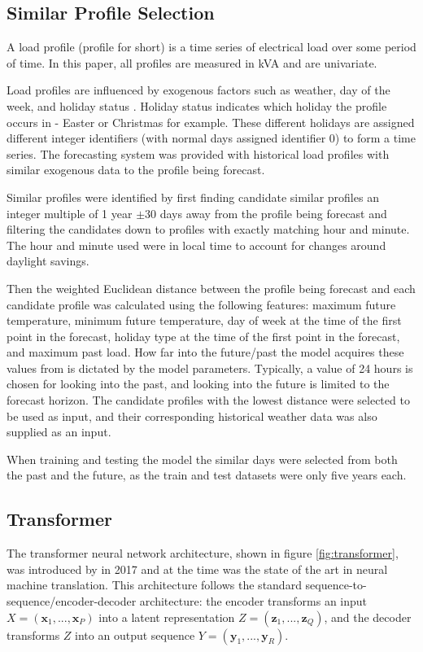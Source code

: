 \documentclass[conference]{IEEEtran}
\begin{document}
\subsection{Similar Profile Selection}
A load profile (profile for short) is a time series of electrical load over some period of time.
In this paper, all profiles are measured in kVA and are univariate. 

Load profiles are influenced by exogenous factors such as weather, day of the week, and holiday status \cite{Weron2006}.
Holiday status indicates which holiday the profile occurs in - Easter or Christmas for example.
These different holidays are assigned different integer identifiers (with normal days assigned identifier 0) to form a time series.
The forecasting system was provided with historical load profiles with similar exogenous data to the profile being forecast.
\par
Similar profiles were identified by first finding candidate similar profiles an integer multiple of 1 year $\pm$30 days away from the profile being forecast and filtering the candidates down to profiles with exactly matching hour and minute.
The hour and minute used were in local time to account for changes around daylight savings.

Then the weighted Euclidean distance between the profile being forecast and each candidate profile was calculated using the following features: maximum future temperature, minimum future temperature, day of week at the time of the first point in the forecast, holiday type at the time of the first point in the forecast, and maximum past load.
How far into the future/past the model acquires these values from is dictated by the model parameters.
Typically, a value of 24 hours is chosen for looking into the past, and looking into the future is limited to the forecast horizon.
The candidate profiles with the lowest distance were selected to be used as input, and their corresponding historical weather data was also supplied as an input.
\par
When training and testing the model the similar days were selected from both the past and the future, as the train and test datasets were only five years each.
\subsection{Transformer}
The transformer neural network architecture, shown in figure \ref{fig:transformer}, was introduced by \cite{Vaswani2017} in 2017 and at the time was the state of the art in neural machine translation.
This architecture follows the standard sequence-to-sequence/encoder-decoder architecture: the encoder transforms an input $X = (\boldsymbol{x}_1, ..., \boldsymbol{x}_P)$ into a latent representation $Z = (\boldsymbol{z}_1, ..., \boldsymbol{z}_Q)$, and the decoder transforms $Z$ into an output sequence $Y = (\boldsymbol{y}_1, ..., \boldsymbol{y}_R)$.
\end{document}

